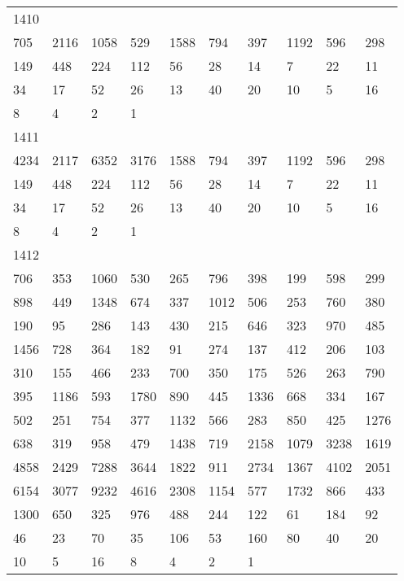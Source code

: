 \begin{longtable}{*{10}{l}}
1410&&&&&&&&&\\
705& 2116& 1058& 529& 1588& 794& 397& 1192& 596& 298\\
149& 448& 224& 112& 56& 28& 14& 7& 22& 11\\
34& 17& 52& 26& 13& 40& 20& 10& 5& 16\\
8& 4& 2& 1& \\

1411&&&&&&&&&\\
4234& 2117& 6352& 3176& 1588& 794& 397& 1192& 596& 298\\
149& 448& 224& 112& 56& 28& 14& 7& 22& 11\\
34& 17& 52& 26& 13& 40& 20& 10& 5& 16\\
8& 4& 2& 1& \\

1412&&&&&&&&&\\
706& 353& 1060& 530& 265& 796& 398& 199& 598& 299\\
898& 449& 1348& 674& 337& 1012& 506& 253& 760& 380\\
190& 95& 286& 143& 430& 215& 646& 323& 970& 485\\
1456& 728& 364& 182& 91& 274& 137& 412& 206& 103\\
310& 155& 466& 233& 700& 350& 175& 526& 263& 790\\
395& 1186& 593& 1780& 890& 445& 1336& 668& 334& 167\\
502& 251& 754& 377& 1132& 566& 283& 850& 425& 1276\\
638& 319& 958& 479& 1438& 719& 2158& 1079& 3238& 1619\\
4858& 2429& 7288& 3644& 1822& 911& 2734& 1367& 4102& 2051\\
6154& 3077& 9232& 4616& 2308& 1154& 577& 1732& 866& 433\\
1300& 650& 325& 976& 488& 244& 122& 61& 184& 92\\
46& 23& 70& 35& 106& 53& 160& 80& 40& 20\\
10& 5& 16& 8& 4& 2& 1& \\


\end{longtable}
